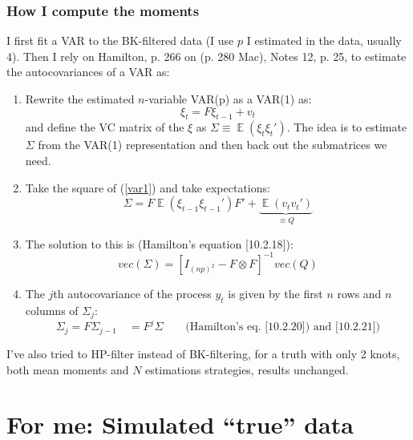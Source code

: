 \documentclass[11pt]{article}
\renewcommand{\[}{\begin{equation}}
\renewcommand{\]}{\end{equation}}
\DeclareMathOperator{\E}{\mathbb{E}}
\newcommand\blankpage{%
    \null
    \thispagestyle{empty}%
    \addtocounter{page}{-1}%
    \newpage}
\begin{document}
\subsubsection{How I compute the moments} 
I first fit a VAR to the BK-filtered data (I use $p$ I estimated in the data, usually 4). Then I rely on Hamilton, p. 266 on (p. 280 Mac), Notes 12, p. 25,  to estimate the autocovariances of a VAR as:
\begin{enumerate}
\item Rewrite the estimated $n$-variable VAR(p) as a VAR(1) as:
\begin{equation}
\xi_t = F\xi_{t-1} + v_t \label{var1}
\end{equation}
and define the VC matrix of the $\xi$ as $\Sigma \equiv \E(\xi_t\xi_t')$. The idea is to estimate $\Sigma$ from the VAR(1) representation and then back out the submatrices we need.
\item Take the square of (\ref{var1}) and take expectations:
\begin{equation}
\Sigma = F\E(\xi_{t-1}\xi_{t-1}')F' + \underbrace{\E(v_tv_t')}_{\equiv Q}
\end{equation}
\item The solution to this is (Hamilton's equation [10.2.18]):
\begin{equation}
vec(\Sigma) = [I_{(np)^2} - F\otimes F]^{-1} vec(Q)
\end{equation}
\item The $j$th autocovariance of the process $y_t$ is given by the first $n$ rows and $n$ columns of $\Sigma_j$:
\begin{equation}
\Sigma_j = F \Sigma_{j-1} \quad = F^j\Sigma \quad \quad \text{(Hamilton's eq. [10.2.20]) and [10.2.21])}
\end{equation}

\end{enumerate}

I've also tried to HP-filter instead of BK-filtering, for a truth with only 2 knots, both  mean moments and $N$ estimations strategies, results unchanged.

\afterpage{\blankpage}

\newpage

\clearpage

\section{For me: Simulated ``true'' data}
\end{document}
